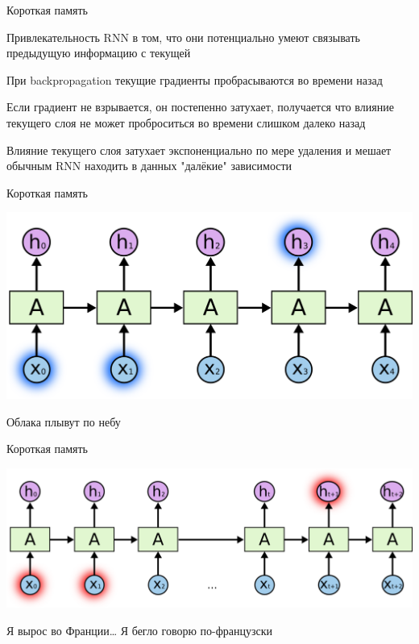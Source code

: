 \documentclass[notes,12pt, aspectratio=169]{beamer}
\newenvironment{wideitemize}{\itemize\addtolength{\itemsep}{10pt}}{\enditemize}
\begin{document}
\begin{frame}{Короткая память}
\begin{wideitemize}
	\item  Привлекательность RNN в том, что они потенциально умеют связывать предыдущую информацию с текущей
	
	\item При backpropagation текущие градиенты пробрасываются во времени назад
	
	\item  Если градиент не взрывается, он постепенно затухает, получается что влияние текущего слоя не может проброситься во времени слишком далеко назад 
	
	\item Влияние текущего слоя затухает экспоненциально по мере удаления и мешает обычным RNN находить в данных "далёкие" зависимости
\end{wideitemize}
\end{frame}


\begin{frame}{Короткая память}
\begin{center}
	\includegraphics[width=.7\linewidth]{simple_rnn1.png}
\end{center}

\large Облака плывут по небу 
\end{frame}


\begin{frame}{Короткая память}
\begin{center}
	\includegraphics[width=.8\linewidth]{simple_rnn2.png}
\end{center}

\large Я вырос во Франции… Я бегло говорю по-французски
\end{frame}
\end{document}
